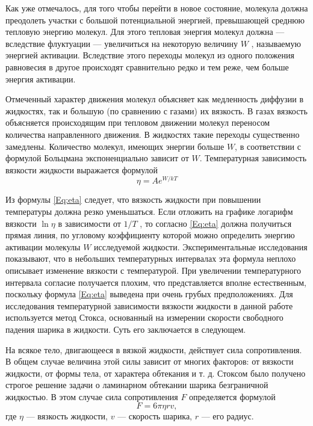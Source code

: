 \documentclass[a4paper,12pt]{article}
\begin{document}
Как уже отмечалось, для того чтобы перейти в новое состояние,
молекула должна преодолеть участки с большой потенциальной энергией, превышающей среднюю тепловую энергию молекул. Для этого
тепловая энергия молекул должна — вследствие флуктуации — увеличиться на некоторую величину $W$ , называемую энергией активации.
Вследствие этого переходы молекул из одного положения равновесия в другое происходят сравнительно редко и тем реже, чем больше
энергия активации.

Отмеченный характер движения молекул объясняет как медленность диффузии в жидкостях, так и большую (по сравнению с газами) их вязкость. В газах вязкость объясняется происходящим при
тепловом движении молекул переносом количества направленного
движения. В жидкостях такие переходы существенно замедлены. Количество молекул, имеющих энергии больше $W$, в соответствии с формулой Больцмана экспоненциально зависит от $W$. Температурная зависимость вязкости жидкости выражается формулой
\begin{equation}
\eta = A e^{W/kT}
\label{Eq:eta}
\end{equation}

Из формулы \eqref{Eq:eta} следует, что вязкость жидкости при повышении температуры должна резко уменьшаться. Если отложить на графике логарифм вязкости $\ln\eta$ в зависимости от $1/T$ , то согласно \eqref{Eq:eta} должна получиться прямая линия, по угловому коэффициенту которой можно
определить энергию активации молекулы $W$ исследуемой жидкости.
Экспериментальные исследования показывают, что в небольших температурных интервалах эта формула неплохо описывает изменение
вязкости с температурой. При увеличении температурного интервала согласие получается плохим, что представляется вполне естественным, поскольку формула \eqref{Eq:eta} выведена при очень грубых предположениях.
Для исследования температурной зависимости вязкости жидкости в данной работе используется метод Стокса, основанный на измерении скорости свободного падения шарика в жидкости. Суть его
заключается в следующем.


На всякое тело, двигающееся в вязкой жидкости, действует сила сопротивления. В общем случае величина этой силы зависит от многих факторов: от вязкости жидкости, от формы тела, от характера
обтекания и т. д. Стоксом было получено строгое решение задачи
о ламинарном обтекании шарика безграничной жидкостью. В этом
случае сила сопротивления $F$ определяется формулой
\begin{equation}
F=6\pi \eta r v,
\label{Eq:stoks}
\end{equation}
где $\eta$ --- вязкость жидкости, $v$ --- скорость шарика, $r$ --- его радиус.
\end{document}
